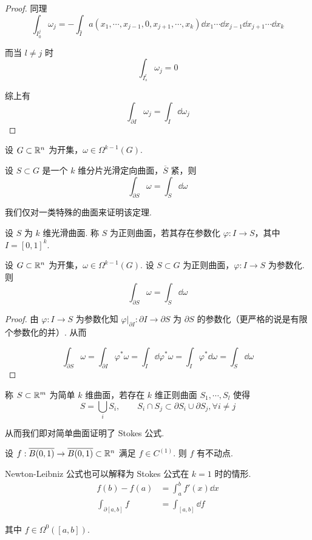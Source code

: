 \begin{proof}
    同理
$$
\int_{I_0^j}\omega_j=-\int_{\hat{I}}a(x_1,\cdots,x_{j-1},0,x_{j+1},\cdots,x_k)\dd x_1\cdots\dd x_{j-1}\dd x_{j+1}\cdots\dd x_{k}
$$

    而当 $l\ne j$ 时
$$
\int_{I_s^l}\omega_j=0
$$

    综上有
$$
\int_{\partial I}\omega_j=\int_I\dd\omega_j
$$
\end{proof}


\begin{theorem}
    设 $G\subset\mathbb{R}^n$ 为开集，$\omega\in\Omega^{k-1}(G)$.

    设 $S\subset G$ 是一个 $k$ 维分片光滑定向曲面，$\overline{S}$ 紧，则
$$
\int_{\partial S}\omega=\int_S\dd\omega
$$
\end{theorem}

我们仅对一类特殊的曲面来证明该定理.

\begin{definition}
    设 $S$ 为 $k$ 维光滑曲面. 称 $S$ 为正则曲面，若其存在参数化 $\varphi:I\to S$，其中 $I=[0,1]^k$.
\end{definition}

\begin{lemma}
    设 $G\subset\mathbb{R}^n$ 为开集，$\omega\in\Omega^{k-1}(G)$. 设 $S\subset G$ 为正则曲面，$\varphi:I\to S$ 为参数化. 则
$$
\int_{\partial S}\omega=\int_S\dd\omega
$$
\end{lemma}
\begin{proof}
    由 $\varphi:I\to S$ 为参数化知 $\varphi|_{\partial I}:\partial I\to\partial S$ 为 $\partial S$ 的参数化（更严格的说是有限个参数化的并）. 从而

$$
\int_{\partial S}\omega=\int_{\partial I}\varphi^*\omega=\int_I\dd\varphi^*\omega=\int_I\varphi^*\dd\omega=\int_S\dd\omega
$$
\end{proof}

\begin{definition}
    称 $S\subset\mathbb{R}^m$ 为简单 $k$ 维曲面，若存在 $k$ 维正则曲面 $S_1,\cdots,S_l$ 使得
$$
S=\bigcup_{i}S_i,\qquad S_i\cap S_j\subset\partial S_i\cup\partial S_j,\forall i\ne j
$$
\end{definition}

从而我们即对简单曲面证明了 Stokes 公式.

\begin{example}
    设 $f:\overline{B(0,1)}\to\overline{B(0,1)}\subset\mathbb{R}^n$ 满足 $f\in C^{(1)}$. 则 $f$ 有不动点.
\end{example}

\begin{hint}
    Newton-Leibniz 公式也可以解释为 Stokes 公式在 $k=1$ 时的情形.
$$
\begin{aligned}
    f(b)-f(a)&=\int_a^bf'(x)\dd x\\
    \int_{\partial[a,b]}f&=\int_{[a,b]}\dd f
\end{aligned}
$$

    其中 $f\in\Omega^0([a,b])$.
\end{hint}
